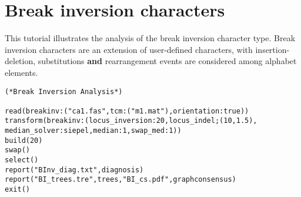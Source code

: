 
\section{Break inversion characters}{\label{tutorial 13}}

This tutorial illustrates the analysis of the break inversion character type.  Break inversion characters are an extension of 
user-defined  characters, with insertion-deletion, substitutions {\bf and} rearrangement 
events are considered among alphabet elements.

\begin{verbatim}
(*Break Inversion Analysis*)

read(breakinv:("ca1.fas",tcm:("m1.mat"),orientation:true))
transform(breakinv:(locus_inversion:20,locus_indel;(10,1.5),
median_solver:siepel,median:1,swap_med:1))
build(20)
swap()
select()
report("BInv_diag.txt",diagnosis)
report("BI_trees.tre",trees,"BI_cs.pdf",graphconsensus)
exit()
\end{verbatim}

